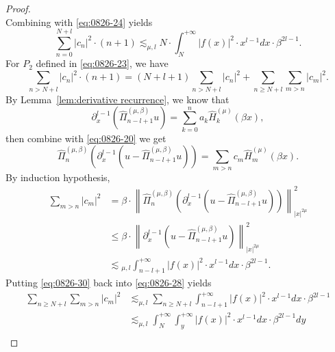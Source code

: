 \documentclass[pdflatex,sn-aps]{sn-jnl}%
\theoremstyle{thmstyleone}%
\theoremstyle{thmstyletwo}%
\theoremstyle{thmstylethree}%
\begin{document}
\begin{appendices}
\begin{proof}
\begin{equation}
  \end{equation}
  Combining with \eqref{eq:0826-24} yields
  \begin{equation}\label{eq:0826-27}
    \sum_{n=0}^{N+l}\left|c_n\right|^2 \cdot(n+1) \lesssim_{\mu, l} N \cdot \int_N^{+\infty}|f(x)|^2 \cdot x^{l-1} d x \cdot \beta^{2 l-1}.
  \end{equation}
  For $P_2$ defined in \eqref{eq:0826-23}, we have
  \begin{equation}\label{eq:0826-28}
    \sum_{n>N+l}\left|c_n\right|^2 \cdot(n+1)=(N+l+1) \sum_{n > N+l}\left|c_n\right|^2+\sum_{n \geqslant N+l} \sum_{m>n}\left|c_m\right|^2.
  \end{equation}
  By Lemma~\ref{lem:derivative recurrence}, we know that
  \begin{equation}\label{eq:0826-28.5}
    \partial_x^{l-1} \left(\widehat{\Pi}_{n-l+1}^{(\mu, \beta)} u\right) = \sum_{k = 0}^{n} a_k \widehat{H}_k^{(\mu)}(\beta x),
  \end{equation}
  then combine with \eqref{eq:0826-20} we get
  \begin{equation}\label{eq:0826-29}
    \widehat{\Pi}_n^{(\mu, \beta)}\left(\partial_x^{l-1}\left(u-\widehat{\Pi}_{n-l+1}^{(\mu, \beta)} u\right)\right)=\sum_{m>n} c_m \widehat{H}_m^{(\mu)}(\beta x).
  \end{equation}
  By induction hypothesis,
  \begin{equation}\label{eq:0826-30}
    \begin{aligned}
    \sum_{m>n}\left|c_m\right|^2 & =\beta \cdot\left\|\widehat{\Pi}_n^{(\mu, \beta)}\left(\partial_x^{l-1}\left(u-\widehat{\Pi}_{n-l+1}^{(\mu, \beta)} u\right)\right)\right\|_{|x|^{2 \mu}}^2 \\
    & \leqslant \beta \cdot\left\|\partial_x^{l-1}\left(u-\widehat{\Pi}_{n-l+1}^{(\mu, \beta)} u\right)\right\|_{|x|^{2 \mu}}^2 \\
    & \lesssim{ }_{\mu, l} \int_{n-l+1}^{+\infty}|f(x)|^2 \cdot x^{l-1} d x \cdot \beta^{2 l-1}.
    \end{aligned}
  \end{equation}
  Putting \eqref{eq:0826-30} back into \eqref{eq:0826-28} yields
  \begin{equation}\label{eq:0826-31}
    \begin{aligned}
    \sum_{n \geqslant N+l} \sum_{m>n}\left|c_m\right|^2 & \lesssim_{\mu, l} \sum_{n \geqslant N+l} \int_{n-l+1}^{+\infty}|f(x)|^2 \cdot x^{l-1} d x \cdot \beta^{2 l-1} \\
    & \lesssim_{\mu, l} \int_N^{+\infty} \int_y^{+\infty}|f(x)|^2 \cdot x^{l-1} d x \cdot \beta^{2 l-1} d y \\

\end{aligned}
\end{equation}
\end{proof}
\end{appendices}
\end{document}
